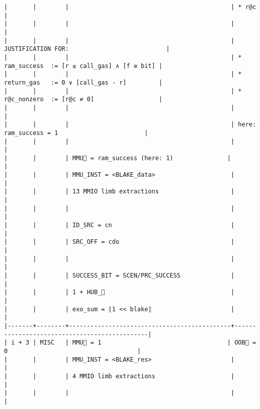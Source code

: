 \documentclass[varwidth=\maxdimen,margin=0.5cm,multi={verbatim}]{standalone}
\begin{document}
\begin{verbatim}
|       |        |                                             | * r@c                                        |
|       |        |                                             |                                              |
|       |        |                                             | JUSTIFICATION FOR:                           |
|       |        |                                             | * ram_success  := [r ≤ call_gas] ∧ [f ≡ bit] |
|       |        |                                             | * return_gas   := 0 ∨ [call_gas - r]         |
|       |        |                                             | * r@c_nonzero  := [r@c ≠ 0]                  |
|       |        |                                             |                                              |
|       |        |                                             | here: ram_success = 1                        |
|       |        |                                             |                                              |
|       |        | MMU🏴 = ram_success (here: 1)               |                                              |
|       |        | MMU_INST = <BLAKE_data>                     |                                              |
|       |        | 13 MMIO limb extractions                    |                                              |
|       |        |                                             |                                              |
|       |        | ID_SRC = cn                                 |                                              |
|       |        | SRC_OFF = cdo                               |                                              |
|       |        |                                             |                                              |
|       |        | SUCCESS_BIT = SCEN/PRC_SUCCESS              |                                              |
|       |        | 1 + HUB_                                   |                                              |
|       |        | exo_sum = ⟦1 << blake⟧                      |                                              |
|-------+--------+---------------------------------------------+----------------------------------------------|
| i + 3 | MISC   | MMU🏴 = 1                                   | OOB🏴 = 0                                    |
|       |        | MMU_INST = <BLAKE_res>                      |                                              |
|       |        | 4 MMIO limb extractions                     |                                              |
|       |        |                                             |                                              |

\end{verbatim}
\end{document}
